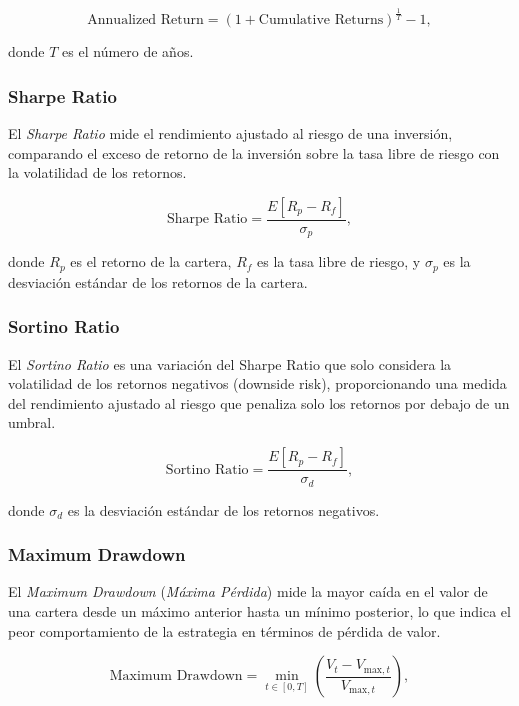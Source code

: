 \documentclass[a4paper,12pt, twoside]{report}
\begin{document}
\begin{equation}
\text{Annualized Return} = \left(1 + \text{Cumulative Returns}\right)^{\frac{1}{T}} - 1,
\end{equation}

donde $T$ es el número de años.

\subsubsection{Sharpe Ratio}

El \textit{Sharpe Ratio} mide el rendimiento ajustado al riesgo de una inversión, comparando el exceso de retorno de la inversión sobre la tasa libre de riesgo con la volatilidad de los retornos.

\begin{equation}
\text{Sharpe Ratio} = \frac{E[R_p - R_f]}{\sigma_p},
\end{equation}

donde $R_p$ es el retorno de la cartera, $R_f$ es la tasa libre de riesgo, y $\sigma_p$ es la desviación estándar de los retornos de la cartera.

\subsubsection{Sortino Ratio}

El \textit{Sortino Ratio} es una variación del Sharpe Ratio que solo considera la volatilidad de los retornos negativos (downside risk), proporcionando una medida del rendimiento ajustado al riesgo que penaliza solo los retornos por debajo de un umbral.

\begin{equation}
\text{Sortino Ratio} = \frac{E[R_p - R_f]}{\sigma_{d}},
\end{equation}

donde $\sigma_{d}$ es la desviación estándar de los retornos negativos.

\subsubsection{Maximum Drawdown}

El \textit{Maximum Drawdown} (\textit{Máxima Pérdida}) mide la mayor caída en el valor de una cartera desde un máximo anterior hasta un mínimo posterior, lo que indica el peor comportamiento de la estrategia en términos de pérdida de valor.

\begin{equation}
\text{Maximum Drawdown} = \min_{t \in [0,T]} \left(\frac{V_t - V_{\text{max}, t}}{V_{\text{max}, t}}\right),
\end{equation}
\end{document}
